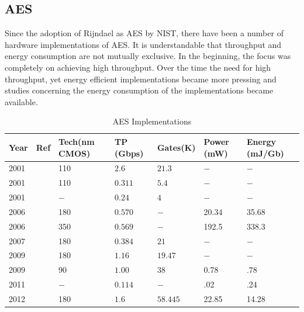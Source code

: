 \documentclass[lnicst,sechang,a4paper]{svmultln}
\begin{document}
\subsection{AES}
\label{sec:aes}
Since the adoption of Rijndael as AES by NIST, there have been a number of hardware implementations of AES. It is understandable that throughput and energy consumption are not mutually exclusive. In the beginning, the focus was completely on achieving high throughput. Over the time the need for high throughput, yet energy efficient implementations became more pressing and studies concerning the energy consumption of the implementations became available.
\begin{table}
\begin{center}
\begin{tabular}{|p{}
				|p{}
				|p{}
				|p{}
				|p{}
				|p{}
				|p{}|
				}
\hline
Year & Ref & Tech(nm CMOS)& TP (Gbps) & Gates(K) & Power (mW) & Energy (mJ/Gb) \\
\hline
2001 & \cite{IBM_Japan_2001} & 110 & $2.6$ &$21.3$  & $-$ & $-$ \\ \hline
2001 & \cite{IBM_Japan_2001} & 110 & $0.311$ &$5.4$  & $-$ & $-$ \\ \hline
2001 & \cite{IBM_India_IIT_2001} & $-$ & $0.24$ &$4$  & $-$ & $-$ \\ \hline
2006 & \cite{Taiwan_2006} & 180 & $0.570$ & $-$ &20.34 & 35.68 \\ \hline
2006 & \cite{Taiwan_2006} & 350 & $0.569$ & $-$ &192.5 & 338.3 \\ \hline
2007 & \cite{IIT_Kharagpur_2007} & 180 & $0.384$ &$21$ & $-$  & $-$ \\ \hline
2009 & \cite{IME_China_Tsinghua_Univerisity_2009} & 180 & $1.16$ &$19.47$ & $-$ & $-$ \\ \hline
2009 & \cite{Ruhr_2009} &90&$ 1.00$ &$38$ &0.78 & $ .78$ \\ \hline
2011 & \cite{Ruhr_2011} & $-$ & $0.114$ &$ - $ &.02 & .24 \\ \hline
2012 & \cite{Pune_2012} & 180 & $1.6$ &$58.445$ &22.85 & 14.28 \\ \hline
\end{tabular}
\end{center}
\caption{AES Implementations}
\label{table:aes_implementation}
\end{table}
\end{document}
